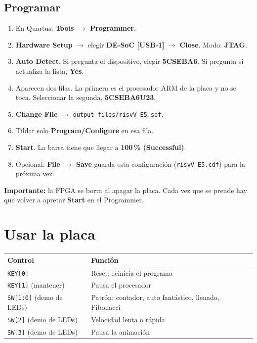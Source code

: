 \documentclass[11pt,a4paper]{article}
\newcommand{\code}[1]{\texttt{#1}}
\newcommand{\menu}[1]{\textsf{\textbf{#1}}}
\begin{document}
\subsection{Programar}
\begin{enumerate}
\item En Quartus: \menu{Tools $\to$ Programmer}.
\item \menu{Hardware Setup} $\to$ elegir \textbf{DE-SoC [USB-1]} $\to$ \menu{Close}. Modo: \textbf{JTAG}.
\item \menu{Auto Detect}. Si pregunta el dispositivo, elegir \textbf{5CSEBA6}. Si pregunta si actualiza la lista, \textbf{Yes}.
\item Aparecen dos filas. La primera es el procesador ARM de la placa y no se toca. Seleccionar la segunda, \textbf{5CSEBA6U23}.
\item \menu{Change File} $\to$ \code{output\_files/risvV\_E5.sof}.
\item Tildar solo \textbf{Program/Configure} en esa fila.
\item \menu{Start}. La barra tiene que llegar a \textbf{100\,\% (Successful)}.
\item Opcional: \menu{File $\to$ Save} guarda esta configuración (\code{risvV\_E5.cdf}) para la próxima vez.
\end{enumerate}

\textbf{Importante:} la FPGA se borra al apagar la placa. Cada vez que se prende hay que volver a apretar \menu{Start} en el Programmer.

\section{Usar la placa}

\begin{center}
\begin{tabular}{ll}
\toprule
Control & Función \\
\midrule
\code{KEY[0]} & Reset: reinicia el programa \\
\code{KEY[1]} (mantener) & Pausa el procesador \\
\code{SW[1:0]} (demo de LEDs) & Patrón: contador, auto fantástico, llenado, Fibonacci \\
\code{SW[2]} (demo de LEDs) & Velocidad lenta o rápida \\
\code{SW[3]} (demo de LEDs) & Pausa la animación \\
\bottomrule
\end{tabular}
\end{center}
\end{document}
